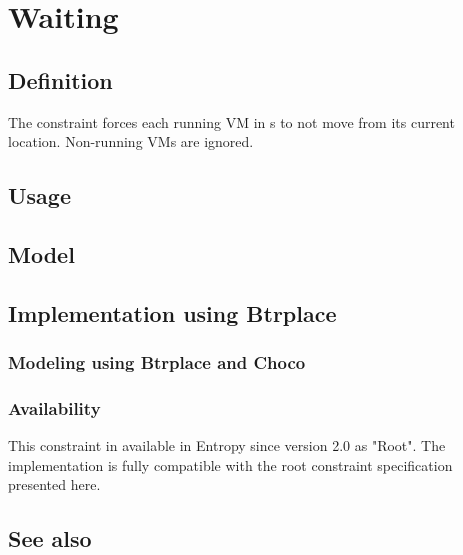\section{Waiting}

\subsection{Definition}

The  constraint forces each running VM in s to not move from its current location. Non-running
VMs are ignored.

\subsection{Usage}

\subsection{Model}

\subsection{Implementation using Btrplace}

\subsubsection{Modeling using Btrplace and Choco}

\subsubsection{Availability}

This constraint in available in Entropy since version 2.0 as "Root". The implementation
is fully compatible with the root constraint specification presented here.

\subsection{See also}